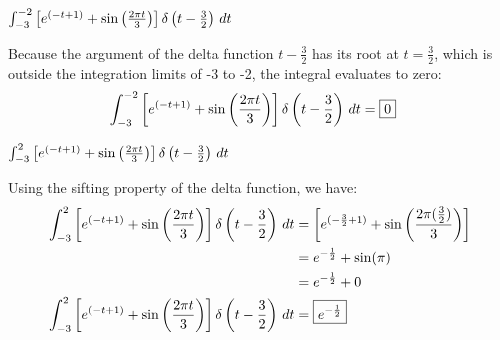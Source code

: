 \documentclass[a4paper, 10pt]{article}
\begin{document}
\begin{tosubmit}
\begin{subproblems}[start=3]
    \item \( \int_{-3}^{-2} \left[ e^{(-t+1)} + \sin \left( \frac{2\pi t}{3} \right) \right] \delta \left(t- \frac{3}{2} \right) \,dt \)
\end{subproblems}

\par\noindent\submitsolution
Because the argument of the delta function \( t - \frac{3}{2} \) has its root at \( t = \frac{3}{2} \), which is outside the integration limits of -3 to -2, the integral evaluates to zero:
\begin{align*}
    \int_{-3}^{-2} \left[ e^{(-t+1)} + \sin \left( \frac{2\pi t}{3} \right) \right] \delta \left(t- \frac{3}{2} \right) \,dt &= \boxed{0}
\end{align*}
\end{tosubmit}


\begin{subproblems}[start=4]
    \item \( \int_{-3}^{2} \left[ e^{(-t+1)} + \sin \left( \frac{2\pi t}{3} \right) \right] \delta \left(t- \frac{3}{2} \right) \,dt \)
\end{subproblems}

\begin{solution}
Using the sifting property of the delta function, we have:
\begin{align*}
    \int_{-3}^{2} \left[ e^{(-t+1)} + \sin \left( \frac{2\pi t}{3} \right) \right] \delta \left(t- \frac{3}{2} \right) \,dt &= \left[ e^{(-\frac{3}{2}+1)} + \sin \left( \frac{2\pi (\frac{3}{2})}{3} \right) \right] \\
    &= e^{-\frac{1}{2}} + \sin(\pi) \\
    &= e^{-\frac{1}{2}} + 0 \\
    \int_{-3}^{2} \left[ e^{(-t+1)} + \sin \left( \frac{2\pi t}{3} \right) \right] \delta \left(t- \frac{3}{2} \right) \,dt &= \boxed{e^{-\frac{1}{2}}}
\end{align*}
\end{solution}
\end{document}
